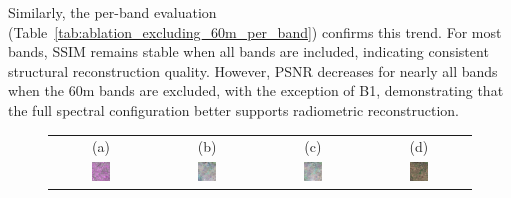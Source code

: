 Similarly, the per-band evaluation (Table~\ref{tab:ablation_excluding_60m_per_band}) confirms this trend. For most bands, SSIM remains stable when all bands are included, indicating consistent structural reconstruction quality. However, PSNR decreases for nearly all bands when the 60m bands are excluded, with the exception of B1, demonstrating that the full spectral configuration better supports radiometric reconstruction.
\begin{figure}[h!]
    \centering
    \setlength{\tabcolsep}{2pt} %
    \renewcommand{\arraystretch}{1.0} %

    \begin{tabular}{cccc}
        (a) & (b) & (c) & (d) \\
        \includegraphics[width=0.2\textwidth, height=0.2\textheight, keepaspectratio]{img/exclusion_60_m/bands10/sample_000034_sar_pseudo.png} &
        \includegraphics[width=0.2\textwidth, height=0.2\textheight, keepaspectratio]{img/exclusion_60_m/bands10/sample_000034_pred_rgb.png} &
        \includegraphics[width=0.2\textwidth, height=0.2\textheight, keepaspectratio]{img/exclusion_60_m/bands13/sample_000034_pred_rgb.png} &
        \includegraphics[width=0.2\textwidth, height=0.2\textheight, keepaspectratio]{img/exclusion_60_m/bands10/sample_000034_true_rgb.png} \\


\end{tabular}
\end{figure}

